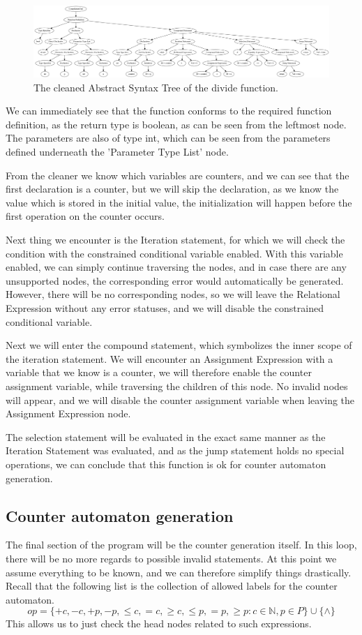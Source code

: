 \documentclass[12pt]{article}
\begin{document}
\begin{figure}[h]
	\centering
	\includegraphics[width=\linewidth]{divide_cleaned}
	\caption{The cleaned Abstract Syntax Tree of the divide function.}
	\label{fig:divide_cleaned}
\end{figure}

We can immediately see that the function conforms to the required function definition, as the return type is boolean, as can be seen from the leftmost node. The parameters are also of type int, which can be seen from the parameters defined underneath the 'Parameter Type List' node.

From the cleaner we know which variables are counters, and we can see that the first declaration is a counter, but we will skip the declaration, as we know the value which is stored in the initial value, the initialization will happen before the first operation on the counter occurs. 

Next thing we encounter is the Iteration statement, for which we will check the condition with the constrained conditional variable enabled. With this variable enabled, we can simply continue traversing the nodes, and in case there are any unsupported nodes, the corresponding error would automatically be generated. However, there will be no corresponding nodes, so we will leave the Relational Expression without any error statuses, and we will disable the constrained conditional variable. 

Next we will enter the compound statement, which symbolizes the inner scope of the iteration statement. We will encounter an Assignment Expression with a variable that we know is a counter, we will therefore enable the counter assignment variable, while traversing the children of this node. No invalid nodes will appear, and we will disable the counter assignment variable when leaving the Assignment Expression node. 

The selection statement will be evaluated in the exact same manner as the Iteration Statement was evaluated, and as the jump statement holds no special operations, we can conclude that this function is ok for counter automaton generation.

\subsection{Counter automaton generation}
The final section of the program will be the counter generation itself. In this loop, there will be no more regards to possible invalid statements. At this point we assume everything to be known, and we can therefore simplify things drastically. Recall that the following list is the collection of allowed labels for the counter automaton.
\[
op = \{+c, -c, +p, -p, \leq c, =c, \geq c, \leq p, =p, \geq p: c \in \mathbb{N}, p \in P\} \cup \{\wedge\}
\]
This allows us to just check the head nodes related to such expressions.
\end{document}
